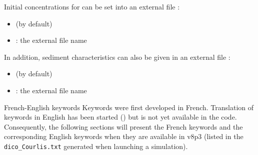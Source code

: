Initial concentrations for \Csuspension can be set into an external file : 
\begin{itemize}
	\item {} (by default)
	\item {} : the external file name
\end{itemize}

In addition, sediment characteristics can also be given in an external file :
\begin{itemize}
	\item {} (by default)
	\item {} : the external file name
\end{itemize}

\begin{WarningBlock}{French-English keywords}
	Keywords were first developed in French. Translation of keywords in English has been started () but is not yet available in the code. Consequently, the following sections will present the French keywords and the corresponding English keywords when they are available in \courlis v8p3 (listed in the \verb|dico_Courlis.txt| generated when launching a \courlis simulation).
\end{WarningBlock}

